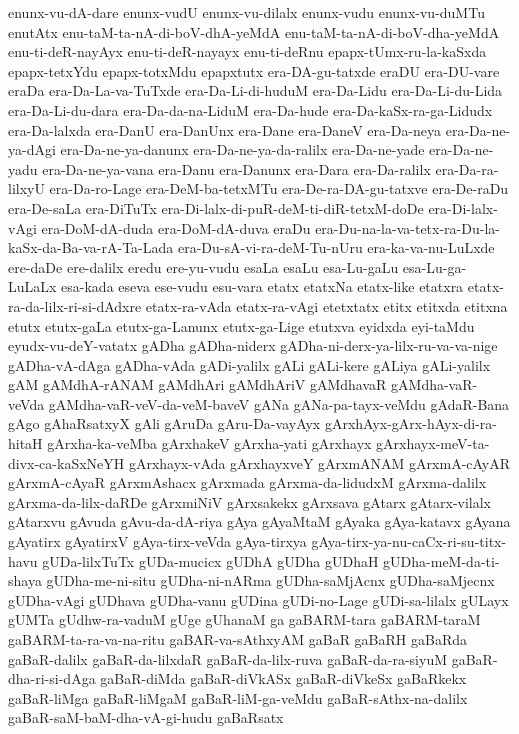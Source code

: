 {enunx-vu-dA-dare
enunx-vudU
enunx-vu-dilalx
enunx-vudu
enunx-vu-duMTu
enutAtx
enu-taM-ta-nA-di-boV-dhA-yeMdA
enu-taM-ta-nA-di-boV-dha-yeMdA
enu-ti-deR-nayAyx
enu-ti-deR-nayayx
enu-ti-deRnu
epapx-tUmx-ru-la-kaSxda
epapx-tetxYdu
epapx-totxMdu
epapxtutx
era-DA-gu-tatxde
eraDU
era-DU-vare
eraDa
era-Da-La-va-TuTxde
era-Da-Li-di-huduM
era-Da-Lidu
era-Da-Li-du-Lida
era-Da-Li-du-dara
era-Da-da-na-LiduM
era-Da-hude
era-Da-kaSx-ra-ga-Lidudx
era-Da-lalxda
era-DanU
era-DanUnx
era-Dane
era-DaneV
era-Da-neya
era-Da-ne-ya-dAgi
era-Da-ne-ya-danunx
era-Da-ne-ya-da-ralilx
era-Da-ne-yade
era-Da-ne-yadu
era-Da-ne-ya-vana
era-Danu
era-Danunx
era-Dara
era-Da-ralilx
era-Da-ra-lilxyU
era-Da-ro-Lage
era-DeM-ba-tetxMTu
era-De-ra-DA-gu-tatxve
era-De-raDu
era-De-saLa
era-DiTuTx
era-Di-lalx-di-puR-deM-ti-diR-tetxM-doDe
era-Di-lalx-vAgi
era-DoM-dA-duda
era-DoM-dA-duva
eraDu
era-Du-na-la-va-tetx-ra-Du-la-kaSx-da-Ba-va-rA-Ta-Lada
era-Du-sA-vi-ra-deM-Tu-nUru
era-ka-va-nu-LuLxde
ere-daDe
ere-dalilx
eredu
ere-yu-vudu
esaLa
esaLu
esa-Lu-gaLu
esa-Lu-ga-LuLaLx
esa-kada
eseva
ese-vudu
esu-vara
etatx
etatxNa
etatx-like
etatxra
etatx-ra-da-lilx-ri-si-dAdxre
etatx-ra-vAda
etatx-ra-vAgi
etetxtatx
etitx
etitxda
etitxna
etutx
etutx-gaLa
etutx-ga-Lanunx
etutx-ga-Lige
etutxva
eyidxda
eyi-taMdu
eyudx-vu-deY-vatatx
gADha
gADha-niderx
gADha-ni-derx-ya-lilx-ru-va-va-nige
gADha-vA-dAga
gADha-vAda
gADi-yalilx
gALi
gALi-kere
gALiya
gALi-yalilx
gAM
gAMdhA-rANAM
gAMdhAri
gAMdhAriV
gAMdhavaR
gAMdha-vaR-veVda
gAMdha-vaR-veV-da-veM-baveV
gANa
gANa-pa-tayx-veMdu
gAdaR-Bana
gAgo
gAhaRsatxyX
gAli
gAruDa
gAru-Da-vayAyx
gArxhAyx-gArx-hAyx-di-ra-hitaH
gArxha-ka-veMba
gArxhakeV
gArxha-yati
gArxhayx
gArxhayx-meV-ta-divx-ca-kaSxNeYH
gArxhayx-vAda
gArxhayxveY
gArxmANAM
gArxmA-cAyAR
gArxmA-cAyaR
gArxmAshacx
gArxmada
gArxma-da-lidudxM
gArxma-dalilx
gArxma-da-lilx-daRDe
gArxmiNiV
gArxsakekx
gArxsava
gAtarx
gAtarx-vilalx
gAtarxvu
gAvuda
gAvu-da-dA-riya
gAya
gAyaMtaM
gAyaka
gAya-katavx
gAyana
gAyatirx
gAyatirxV
gAya-tirx-veVda
gAya-tirxya
gAya-tirx-ya-nu-caCx-ri-su-titx-havu
gUDa-lilxTuTx
gUDa-mucicx
gUDhA
gUDha
gUDhaH
gUDha-meM-da-ti-shaya
gUDha-me-ni-situ
gUDha-ni-nARma
gUDha-saMjAcnx
gUDha-saMjecnx
gUDha-vAgi
gUDhava
gUDha-vanu
gUDina
gUDi-no-Lage
gUDi-sa-lilalx
gULayx
gUMTa
gUdhw-ra-vaduM
gUge
gUhanaM
ga
gaBARM-tara
gaBARM-taraM
gaBARM-ta-ra-va-na-ritu
gaBAR-va-sAthxyAM
gaBaR
gaBaRH
gaBaRda
gaBaR-dalilx
gaBaR-da-lilxdaR
gaBaR-da-lilx-ruva
gaBaR-da-ra-siyuM
gaBaR-dha-ri-si-dAga
gaBaR-diMda
gaBaR-diVkASx
gaBaR-diVkeSx
gaBaRkekx
gaBaR-liMga
gaBaR-liMgaM
gaBaR-liM-ga-veMdu
gaBaR-sAthx-na-dalilx
gaBaR-saM-baM-dha-vA-gi-hudu
gaBaRsatx
}
